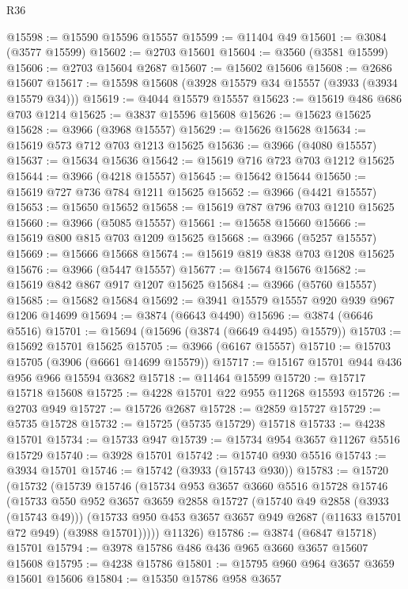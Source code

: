 \begin{lexlean}{R36}
\begin{coremodule}
@15598 := @15590 @15596 @15557
@15599 := @11404 @49
@15601 := @3084 (@3577 @15599)
@15602 := @2703 @15601
@15604 := @3560 (@3581 @15599)
@15606 := @2703 @15604 @2687
@15607 := @15602 @15606
@15608 := @2686 @15607
@15617 := @15598 @15608 (@3928 @15579 @34 @15557 (@3933 (@3934 @15579 @34)))
@15619 := @4044 @15579 @15557
@15623 := @15619 @486 @686 @703 @1214
@15625 := @3837 @15596 @15608
@15626 := @15623 @15625
@15628 := @3966 (@3968 @15557)
@15629 := @15626 @15628
@15634 := @15619 @573 @712 @703 @1213 @15625
@15636 := @3966 (@4080 @15557)
@15637 := @15634 @15636
@15642 := @15619 @716 @723 @703 @1212 @15625
@15644 := @3966 (@4218 @15557)
@15645 := @15642 @15644
@15650 := @15619 @727 @736 @784 @1211 @15625
@15652 := @3966 (@4421 @15557)
@15653 := @15650 @15652
@15658 := @15619 @787 @796 @703 @1210 @15625
@15660 := @3966 (@5085 @15557)
@15661 := @15658 @15660
@15666 := @15619 @800 @815 @703 @1209 @15625
@15668 := @3966 (@5257 @15557)
@15669 := @15666 @15668
@15674 := @15619 @819 @838 @703 @1208 @15625
@15676 := @3966 (@5447 @15557)
@15677 := @15674 @15676
@15682 := @15619 @842 @867 @917 @1207 @15625
@15684 := @3966 (@5760 @15557)
@15685 := @15682 @15684
@15692 := @3941 @15579 @15557 @920 @939 @967 @1206 @14699
@15694 := @3874 (@6643 @4490)
@15696 := @3874 (@6646 @5516)
@15701 := @15694 (@15696 (@3874 (@6649 @4495) @15579))
@15703 := @15692 @15701 @15625
@15705 := @3966 (@6167 @15557)
@15710 := @15703 @15705 (@3906 (@6661 @14699 @15579))
@15717 := @15167 @15701 @944 @436 @956 @966 @15594 @3682
@15718 := @11464 @15599
@15720 := @15717 @15718 @15608
@15725 := @4228 @15701 @22 @955 @11268 @15593
@15726 := @2703 @949
@15727 := @15726 @2687
@15728 := @2859 @15727
@15729 := @5735 @15728
@15732 := @15725 (@5735 @15729) @15718
@15733 := @4238 @15701
@15734 := @15733 @947
@15739 := @15734 @954 @3657 @11267 @5516 @15729
@15740 := @3928 @15701
@15742 := @15740 @930 @5516
@15743 := @3934 @15701
@15746 := @15742 (@3933 (@15743 @930))
@15783 := @15720
    (@15732
      (@15739
        @15746
        (@15734
          @953
          @3657
          @3660
          @5516
          @15728
          @15746
          (@15733
            @550
            @952
            @3657
            @3659
            @2858
            @15727
            (@15740 @49 @2858 (@3933 (@15743 @49)))
            (@15733 @950 @453 @3657 @3657 @949 @2687 (@11633 @15701 @72 @949) (@3988 @15701)))))
      @11326)
@15786 := @3874 (@6847 @15718) @15701
@15794 := @3978 @15786 @486 @436 @965 @3660 @3657 @15607 @15608
@15795 := @4238 @15786
@15801 := @15795 @960 @964 @3657 @3659 @15601 @15606
@15804 := @15350 @15786 @958 @3657

\end{coremodule}
\end{lexlean}
